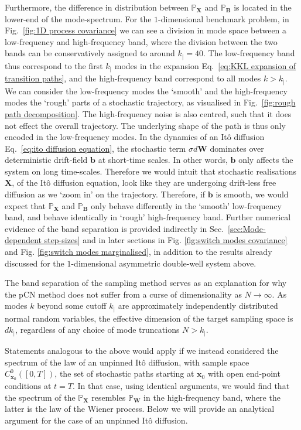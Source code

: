Furthermore, the difference in distribution between $\mathbb{P}_\mathbf{X}$ and $\mathbb{P}_\mathbf{B}$ is located in the lower-end of the mode-spectrum. For the $1$-dimensional benchmark problem, in Fig.~\ref{fig:1D process covariance} we can see a division in mode space between a low-frequency and high-frequency band, where the division between the two bands can be conservatively assigned to around $k_| = 40$. The low-frequency band thus correspond to the first $k_|$ modes in the expansion Eq.~\ref{eq:KKL expansion of transition paths}, and the high-frequency band correspond to all modes $k > k_|$. We can consider the low-frequency modes the `smooth' and the high-frequency modes the `rough' parts of a stochastic trajectory, as visualised in Fig.~\ref{fig:rough path decomposition}. The high-frequency noise is also centred, such that it does not effect the overall trajectory. The underlying shape of the path is thus only encoded in the low-frequency modes. In the dynamics of an It\^{o} diffusion Eq.~\ref{eq:ito diffusion equation}, the stochastic term $\sigma d\mathbf{W}$ dominates over deterministic drift-field $\mathbf{b}$ at short-time scales. In other words, $\mathbf{b}$ only affects the system on long time-scales. Therefore we would intuit that stochastic realisations $\mathbf{X}$, of the It\^{o} diffusion equation, look like they are undergoing drift-less free diffusion as we `zoom in' on the trajectory. Therefore, if $\mathbf{b}$ is smooth, we would expect that $\mathbb{P}_\mathbf{X}$ and $\mathbb{P}_\mathbf{B}$ only behave differently in the `smooth' low-frequency band, and behave identically in `rough' high-frequency band. Further numerical evidence of the band separation is provided indirectly in Sec.~\ref{sec:Mode-dependent step-sizes} and in later sections in Fig. \ref{fig:switch modes covariance} and Fig. \ref{fig:switch modes marginalised}, in addition to the results already discussed for the $1$-dimensional asymmetric double-well system above.

The band separation of the sampling method serves as an explanation for why the pCN method does not suffer from a curse of dimensionality as $N \to \infty$. As modes $k$ beyond some cutoff $k_|$ are approximately independently distributed normal random variables, the effective dimension of the target sampling space is $d k_|$, regardless of any choice of mode truncations $N > k_|$.

Statements analogous to the above would apply if we instead considered the spectrum of the law of an unpinned It\^{o} diffusion, with sample space $C_{\mathbf{x}_0}^0([0,T])$, the set of stochastic paths starting at $\mathbf{x}_0$ with open end-point conditions at $t=T$. In that case, using identical arguments, we would find that the spectrum of the $\mathbb{P}_\mathbf{X}$ resembles $\mathbb{P}_\mathbf{W}$ in the high-frequency band, where the latter is the law of the Wiener process. Below we will provide an analytical argument for the case of an unpinned It\^{o} diffusion.

